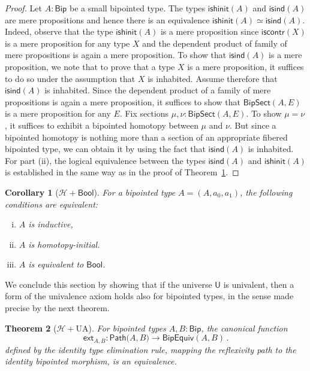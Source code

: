 \documentclass[10pt,a4paper,oneside,reqno]{amsart}
\numberwithin{equation}{section}
\theoremstyle{mythm}
\newtheorem{theorem}{Theorem}[section]
\newtheorem{corollary}[theorem]{Corollary}
\theoremstyle{mydef}
\theoremstyle{myrmk}
\newcommand{\co}{\colon}
\newcommand{\Hint}{\mathcal{H}}
\newcommand{\iscontr}{\mathsf{iscontr}}
\newcommand{\ext}{\mathsf{ext}}
\newcommand{\Id}{\mathsf{Path}}
\newcommand{\Bool}{\mathsf{Bool}}
\newcommand{\UU}{\mathsf{U}}
\newcommand{\Bip}{\mathsf{Bip}}
\newcommand{\BipSect}{\mathsf{BipSect}}
\newcommand{\ishinit}{\mathsf{ishinit}}
\newcommand{\isind}{\mathsf{isind}}
\newcommand{\BipEquiv}{\mathsf{BipEquiv}}
\begin{document}
\begin{proof}Let   $A: \Bip$ be a small bipointed type.
 The types $\ishinit(A)$ and $\isind(A)$ are mere
propositions and hence there is an equivalence $\ishinit(A)  \simeq   \isind(A)$.
Indeed, observe that
the type $\ishinit(A)$ is a mere proposition since $\iscontr(X)$ is a mere proposition for any type $X$ and the dependent product of family of mere propositions is again a mere proposition. To show that $\isind (A)$ is a mere proposition, we note that to prove that a type $X$ is a mere proposition, it suffices to do so under the assumption that $X$ is inhabited. Assume therefore that $\isind(A)$ is inhabited. Since the dependent product of a family of mere propositions is again a mere proposition, it suffices to show that $\BipSect(A,E)$ is a mere proposition for any $E$. Fix sections $\mu, \nu : \BipSect(A,E)$. To show $\mu = \nu$, it suffices to exhibit a bipointed homotopy between $\mu$ and $\nu$. But since a bipointed homotopy is nothing more than a section of an appropriate fibered bipointed type, we can obtain it by using the fact that $\isind(A)$ is inhabited.
For part (ii), the logical equivalence between the types $\isind(A)$ and 
$\ishinit(A)$ is established in the same way as in the proof of  Theorem~\ref{lem:BoolMainInt}. 
\end{proof}



\begin{corollary}[$\Hint + \Bool$]\label{lem:BoolMainInt} For a bipointed type $A = (A, a_0, a_1)$, the following 
conditions are equivalent:
\begin{enumerate}[(i)]
\item $A$ is inductive,
\item $A$ is homotopy-initial.
\item $A$ is equivalent to $\Bool$.
\end{enumerate}
\end{corollary}

We conclude this section by showing that if the universe $\UU$ is univalent, then a form of the univalence axiom holds also for bipointed types, in the sense made precise by the next theorem.


\begin{theorem}[$\Hint + \mathrm{UA}$] \label{thm:bipunivalence}
For bipointed types $A, B : \Bip$, the canonical function
\[ 
\ext_{A,B} \co \Id \big(A,B\big) \to  \BipEquiv(A,B) \, .
\] 
defined by the identity type elimination rule, mapping the reflexivity path to the identity bipointed morphism, 
is an equivalence.
\end{theorem} 
\end{document}
